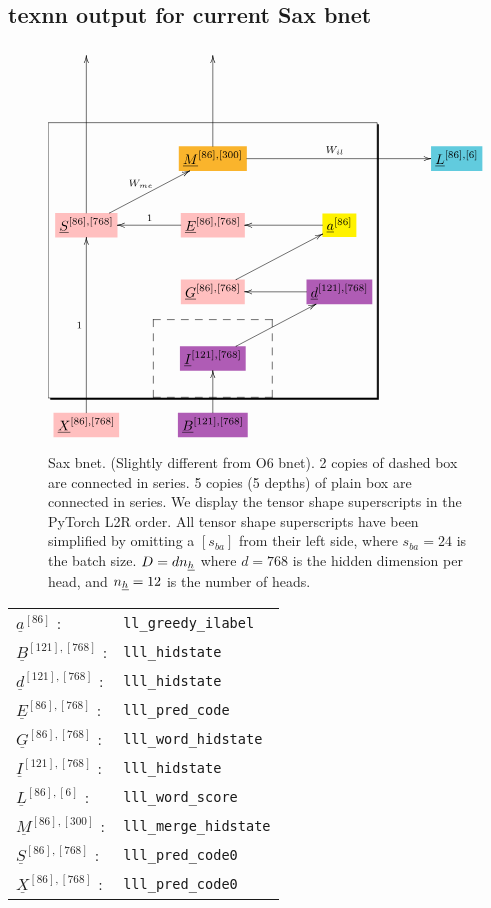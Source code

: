 \documentclass[12pt]{article}
\begin{document}
\subsection{texnn output for current Sax bnet}

\begin{figure}[h!]\centering
$$\xymatrix@R=2.5pc@C=3.5pc{
&&&
\\
&&&
\\
&*+[F*:Dandelion]{\underline{M}^{[86], [300]}}\ar[uu]\ar[rr]^{W_{il}}&&*+[F*:SkyBlue]{\underline{L}^{[86], [6]}}
\\
*+[F*:pink]{\underline{S}^{[86], [768]}}\ar[uuu]\ar[ur]^{W_{me}}&*+[F*:pink]{\underline{E}^{[86], [768]}}\ar[l]_{1}&*+[F*:yellow]{\underline{a}^{[86]}}\ar[l]&
\\
&*+[F*:pink]{\underline{G}^{[86], [768]}}\ar[ur]&*+[F*:Orchid]{\underline{d}^{[121], [768]}}\ar[l]&
\\
&*+[F*:Orchid]{\underline{I}^{[121], [768]}}\ar[ur]&&
\\
*+[F*:pink]{\underline{X}^{[86], [768]}}\ar[uuu]^{1}&*+[F*:Orchid]{\underline{B}^{[121], [768]}}\ar[u]&&
\save
\POS"3,1"."6,1"."3,3"."6,3"!C*+<4.8em>\frm{-,}
\POS"6,2"."6,2"."6,2"."6,2"!C*+<3.8em>\frm{--}
\restore
}$$
\caption{Sax bnet. (Slightly different from O6 bnet). 2 copies of dashed box are connected in series. 5 copies (5 depths) of plain box are connected in series. We display the tensor shape superscripts in the PyTorch L2R order. All tensor shape superscripts have been simplified by omitting a $[s_{ba}]$ from their left side, where $s_{ba}=24$ is the batch size. $D= d n_{\underline{h}}$ where $d=768$ is the hidden dimension per head, and $n_{\underline{h}}=12$ is the number of heads. }
\label{fig-texnn-for-sentence-ax-bnet}
\end{figure}

\begin{tabular}{ll}
$\underline{a}^{[86]}$ :&{\tt ll\_greedy\_ilabel}\\
$\underline{B}^{[121], [768]}$ :&{\tt lll\_hidstate}\\
$\underline{d}^{[121], [768]}$ :&{\tt lll\_hidstate}\\
$\underline{E}^{[86], [768]}$ :&{\tt lll\_pred\_code}\\
$\underline{G}^{[86], [768]}$ :&{\tt lll\_word\_hidstate}\\
$\underline{I}^{[121], [768]}$ :&{\tt lll\_hidstate}\\
$\underline{L}^{[86], [6]}$ :&{\tt lll\_word\_score}\\
$\underline{M}^{[86], [300]}$ :&{\tt lll\_merge\_hidstate}\\
$\underline{S}^{[86], [768]}$ :&{\tt lll\_pred\_code0}\\
$\underline{X}^{[86], [768]}$ :&{\tt lll\_pred\_code0}
\end{tabular}
\end{document}
